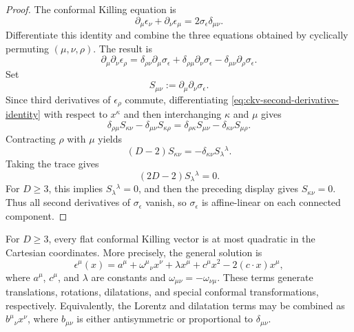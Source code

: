 \begin{proof}
The conformal Killing equation is
\[
  \partial_\mu\epsilon_\nu+\partial_\nu\epsilon_\mu
  =
  2\sigma_\epsilon\delta_{\mu\nu}.
\]
Differentiate this identity and combine the three equations obtained by
cyclically permuting \((\mu,\nu,\rho)\).  The result is
\begin{equation}
  \partial_\mu\partial_\nu\epsilon_\rho
  =
  \delta_{\rho\nu}\partial_\mu\sigma_\epsilon
  +
  \delta_{\rho\mu}\partial_\nu\sigma_\epsilon
  -
  \delta_{\mu\nu}\partial_\rho\sigma_\epsilon .
  \label{eq:ckv-second-derivative-identity}
\end{equation}
Set
\[
  S_{\mu\nu}:=\partial_\mu\partial_\nu\sigma_\epsilon .
\]
Since third derivatives of \(\epsilon_\rho\) commute, differentiating
\eqref{eq:ckv-second-derivative-identity} with respect to \(x^\kappa\) and
then interchanging \(\kappa\) and \(\mu\) gives
\[
  \delta_{\rho\mu}S_{\kappa\nu}
  -
  \delta_{\mu\nu}S_{\kappa\rho}
  =
  \delta_{\rho\kappa}S_{\mu\nu}
  -
  \delta_{\kappa\nu}S_{\mu\rho}.
\]
Contracting \(\rho\) with \(\mu\) yields
\[
  (D-2)S_{\kappa\nu}
  =
  -\delta_{\kappa\nu}S_\lambda{}^\lambda .
\]
Taking the trace gives
\[
  (2D-2)S_\lambda{}^\lambda=0.
\]
For \(D\ge3\), this implies \(S_\lambda{}^\lambda=0\), and then the preceding
display gives \(S_{\kappa\nu}=0\).  Thus all second derivatives of
\(\sigma_\epsilon\) vanish, so \(\sigma_\epsilon\) is affine-linear on each
connected component.
\end{proof}

\begin{proposition}
\label{prop:flat-conformal-killing-vector-classification}
For \(D\ge3\), every flat conformal Killing vector is at most quadratic in the
Cartesian coordinates.  More precisely, the general solution is
\begin{equation}
  \epsilon^\mu(x)
  =
  a^\mu
  +
  \omega^\mu{}_\nu x^\nu
  +
  \lambda x^\mu
  +
  c^\mu x^2-2(c\cdot x)x^\mu,
  \label{eq:ckv-general-solution}
\end{equation}
where \(a^\mu\), \(c^\mu\), and \(\lambda\) are constants and
\(\omega_{\mu\nu}=-\omega_{\nu\mu}\).  These terms generate translations,
rotations, dilatations, and special conformal transformations, respectively.
Equivalently, the Lorentz and dilatation terms may be combined as
\(b^\mu{}_\nu x^\nu\), where \(b_{\mu\nu}\) is either antisymmetric or
proportional to \(\delta_{\mu\nu}\).
\end{proposition}

